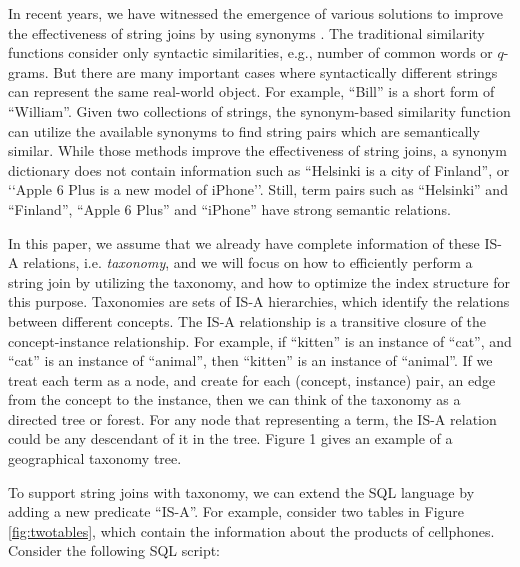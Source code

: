 In recent years, we have witnessed the emergence of various solutions to improve the effectiveness of string joins by using synonyms \cite{conf/sigmod/LuLWLW13,conf/icde/ArasuCK08,conf/cpm/BarbayGMR06,conf/vldb/ArvindSR09}.
The traditional similarity functions consider only syntactic similarities, e.g., number of common
words or $q$-grams. But there are many important cases where syntactically different
strings can represent the same real-world object. For example,
``\textsf{Bill}'' is a short form of ``\textsf{William}''.  Given two collections of strings,  the synonym-based similarity function can utilize the available synonyms to find string pairs which are semantically similar. While those methods improve the effectiveness of string joins, a synonym dictionary does not contain information such as
``\textsf{Helsinki is a city of Finland}'', or `\textsf{`Apple 6 Plus is a new model of iPhone}''. Still, term pairs such as ``\textsf{Helsinki}'' and ``\textsf{Finland}'', ``\textsf{Apple 6 Plus}'' and ``\textsf{iPhone}''  have strong semantic relations.


In this paper, we assume that we already have complete
information of these IS-A relations, i.e. \textit{taxonomy}, and we will focus on how
to efficiently perform a string join by utilizing the taxonomy, and how to optimize the index structure
for this purpose.  Taxonomies are sets of IS-A hierarchies, which identify the relations between different concepts. The IS-A relationship
is a transitive closure of the concept-instance relationship.
For example, if ``\textsf{kitten}'' is an instance of ``\textsf{cat}'', and
``\textsf{cat}'' is an instance of ``\textsf{animal}'', then ``\textsf{kitten}'' is an instance
of ``\textsf{animal}''. If we treat each term as a node, and create
for each (concept, instance) pair, an edge from the concept
to the instance, then we can think of the taxonomy as a directed tree or forest. For any node that representing a term,
the IS-A relation could be any descendant of it in the tree. Figure
1 gives an example of a geographical taxonomy tree.




To support string joins with taxonomy, we can extend the SQL language by adding a new predicate ``IS-A''. For example,
consider two tables in Figure \ref{fig:twotables}, which contain the information about the products of cellphones.  Consider the following SQL script:

